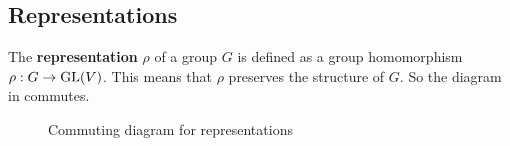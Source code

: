 \subsection{Representations}

The \textbf{representation} $\rho$ of a group $G$ is defined as a group homomorphism $\rho: G \to \text{GL}(V)$.
This means that $\rho$ preserves the structure of $G$.
So the diagram in  commutes.
\begin{figure}[h]
    \centering
    \caption{Commuting diagram for representations}
    \label{fig:main.what.rep-cd}
\end{figure}
